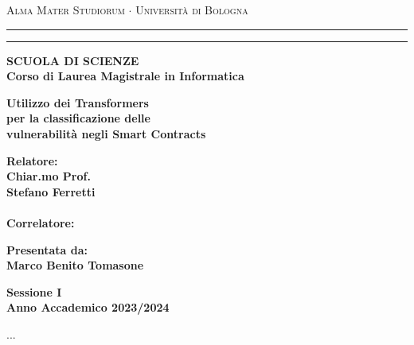 \documentclass[12pt,a4paper]{report}
\newenvironment{dedication}
{%
\thispagestyle{empty}%
\vspace*{\stretch{1}}%
\itshape             %
\raggedleft          %
}
{\par %
\vspace{\stretch{3}} %
\clearpage           %
}
\begin{document}
\begin{titlepage}
    \begin{center}
    {{\Large{\textsc{Alma Mater Studiorum $\cdot$ Universit\`a di
    Bologna}}}} \rule[0.1cm]{15.8cm}{0.1mm}
    \rule[0.5cm]{15.8cm}{0.6mm}
    {\small{\bf SCUOLA DI SCIENZE\\
    Corso di Laurea Magistrale in Informatica }}
    \end{center}
    \vspace{15mm}
    \begin{center}
    {\LARGE{\bf Utilizzo dei Transformers}}\\
    \vspace{3mm}
    {\LARGE{\bf per la classificazione delle }}\\
    \vspace{3mm}
    {\LARGE{\bf  vulnerabilità negli Smart Contracts }}\\
    \end{center}
    \vspace{40mm}
    \par
    \noindent
    \begin{minipage}[t]{0.47\textwidth}
    {\large{\bf Relatore:\\
    Chiar.mo Prof.\\
    Stefano Ferretti\\
    \\
    Correlatore:\\
    }}
    \end{minipage}
    \hfill
    \begin{minipage}[t]{0.47\textwidth}\raggedleft
    {\large{\bf Presentata da:\\
    Marco Benito Tomasone}}
    \end{minipage}
    \vspace{20mm}
    \begin{center}
    {\large{\bf Sessione I\\%
    Anno Accademico 2023/2024}}%
    \end{center}
    \end{titlepage}

    \begin{dedication}
       ...
    \end{dedication}
    \tableofcontents
    \listoffigures
    \listoftables
    











\nocite{*}
\end{document}
